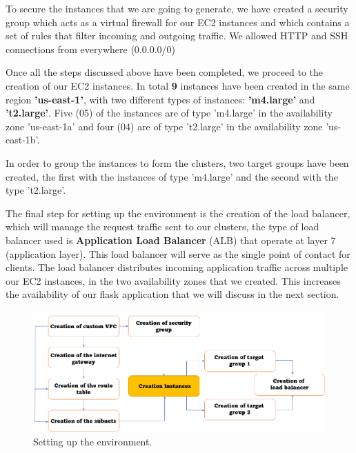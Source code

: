 \documentclass[12pt]{article}
\begin{document}
To secure the instances that we are going to generate, we have created a security group which acts as a virtual firewall for our EC2 instances and which contains a set of rules that filter incoming and outgoing traffic. We allowed HTTP and SSH connections from everywhere (0.0.0.0/0)\vspace{1em}

Once all the steps discussed above have been completed, we proceed to the creation of our EC2 instances. In total \textbf{9} instances have been created in the same region \textbf{'us-east-1'}, with two different types of instances: \textbf{'m4.large'} and \textbf{'t2.large'}. Five (05) of the instances are of type 'm4.large' in the availability zone 'us-east-1a' and four (04) are of type 't2.large' in the availability zone 'us-east-1b'.\vspace{1em}

In order to group the instances to form the clusters, two target groups have been created, the first with the instances of type 'm4.large' and the second with the type 't2.large'.\vspace{1em}

The final step for setting up the environment is the creation of the load balancer, which will manage the request traffic sent to our clusters, the type of load balancer used is \textbf{Application Load Balancer} (ALB) that operate at layer 7 (application layer). This load balancer will serve	 as	 the	 single	 point	 of	 contact	 for	 clients.	 The	 load	 balancer	 distributes	 incoming	application	traffic	across	multiple	our	EC2	instances,	in the two	availability	zones that we created.	This	increases	the	availability	of	our	flask application that we will discuss in the next section.

\begin{figure}[h]
  \includegraphics[width=\linewidth]{Environment_setup.png}
  \caption{Setting up the environment.}
  \label{fig:boat1}
\end{figure}
\end{document}
